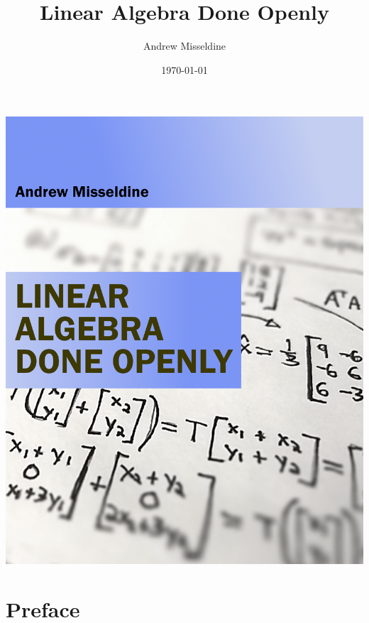 \begin{center}
\includegraphics[scale=0.85]{FrontMatter/cover.png}%
\end{center}

\title{Linear Algebra Done Openly}
\author{Andrew Misseldine}
\date{\today}
\maketitle

\tableofcontents


\chapter*{Preface}

